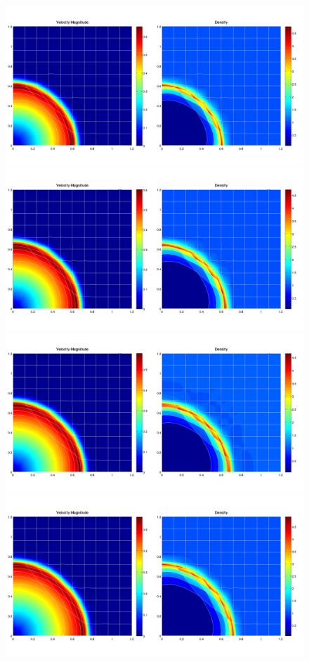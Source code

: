 \documentclass[8pt,xcolor=svgnames]{beamer}
\begin{document}
\begin{frame}
\begin{figure}[ht]
\begin{animateinline}[autoplay,width=\textwidth]{1}
    \newframe[1]
    \includegraphics{./Images/SedovAnimation/SedovAnimation_80.png}
    \newframe[1]
    \includegraphics{./Images/SedovAnimation/SedovAnimation_90.png}
    \newframe[1]
    \includegraphics{./Images/SedovAnimation/SedovAnimation_100.png}
    \newframe[1]
    \includegraphics{./Images/SedovAnimation/SedovAnimation_110.png}

\end{animateinline}
\end{figure}
\end{frame}
\end{document}
